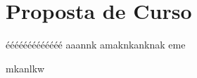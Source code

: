 

                      
\chapter{Proposta de Curso }\label{CapPropostaDeCurso}
ééééééééééééé aaannk
amaknkanknak eme


mkanlkw